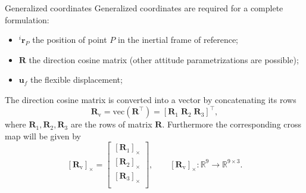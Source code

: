 \documentclass[aspectratio=169]{ISAE-Beamer}
\newcommand{\crmat}[1]{\ensuremath{\left[#1\right]_\times}}
\begin{document}
\begin{frame}{Generalized coordinates}
Generalized coordinates are required for a complete formulation:
\begin{itemize}
	\item $^i \bm{r}_P$ the position of point $P$ in the inertial frame of reference;
	\item $\bm{R}$ the direction cosine matrix (other attitude parametrizations are possible);
	\item $\bm{u}_f$ the flexible displacement;
\end{itemize}
The direction cosine matrix is converted into a vector by concatenating its rows
\begin{equation*}
\bm{R}_{\text{v}} = \text{vec}(\bm{R}^\top) = [\bm{R}_1 \; \bm{R}_2 \; \bm{R}_3]^\top,
\end{equation*}
where $\bm{R}_{1}, \bm{R}_{2}, \bm{R}_{3}$ are the rows of matrix $\bm{R}$. Furthermore the corresponding cross map will be given by
\begin{equation*}
\crmat{\bm{R}_{\text{v}}} = 
\begin{bmatrix}
\crmat{\bm{R}_1} \\
\crmat{\bm{R}_2} \\
\crmat{\bm{R}_3} \\
\end{bmatrix}, \qquad 
\crmat{\bm{R}_{\text{v}}} : \mathbb{R}^9 \rightarrow \mathbb{R}^{9 \times 3}.
\end{equation*}
\end{frame}
\end{document}
